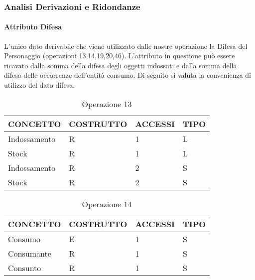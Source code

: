 
\subsubsection{Analisi Derivazioni e Ridondanze}

\paragraph[H]{Attributo Difesa}L'unico dato derivabile che viene utilizzato dalle nostre operazione  la Difesa del Personaggio (operazioni 13,14,19,20,46). L'attributo in questione pu\`{o} essere ricavato dalla somma della difesa degli oggetti indossati e dalla somma della difesa delle occorrenze dell'entit\`{a} consumo. Di seguito si valuta la convenienza di utilizzo del dato difesa.



\begin{table}[H]
\centering
\caption{Operazione 13}
\begin{tabular}{llll}
\\ \hline
\multicolumn{1}{|l|}{\textbf{CONCETTO}} & \multicolumn{1}{l|}{\textbf{COSTRUTTO}} & \multicolumn{1}{l|}{\textbf{ACCESSI}} & \multicolumn{1}{l|}{\textbf{TIPO}} \\ \hline
\multicolumn{1}{|l|}{Indossamento}      & \multicolumn{1}{l|}{R}                  & \multicolumn{1}{l|}{1}                & \multicolumn{1}{l|}{L}             \\ \hline
\multicolumn{1}{|l|}{Stock}             & \multicolumn{1}{l|}{R}                  & \multicolumn{1}{l|}{1}                & \multicolumn{1}{l|}{L}             \\ \hline
\multicolumn{1}{|l|}{Indossamento}      & \multicolumn{1}{l|}{R}                  & \multicolumn{1}{l|}{2}                & \multicolumn{1}{l|}{S}             \\ \hline
\multicolumn{1}{|l|}{Stock}             & \multicolumn{1}{l|}{R}                  & \multicolumn{1}{l|}{2}                & \multicolumn{1}{l|}{S}             \\ \hline
\end{tabular}
\end{table}


\begin{table}[H]
\centering
\caption{Operazione 14}
\label{my-label}
\begin{tabular}{|l|l|l|l|}
\hline
\textbf{CONCETTO} & \textbf{COSTRUTTO} & \textbf{ACCESSI} & \textbf{TIPO} \\ \hline
Consumo           & E                  & 1                & S             \\ \hline
Consumante        & R                  & 1                & S             \\ \hline
Consunto          & R                  & 1                & S             \\ \hline
\end{tabular}
\end{table}


